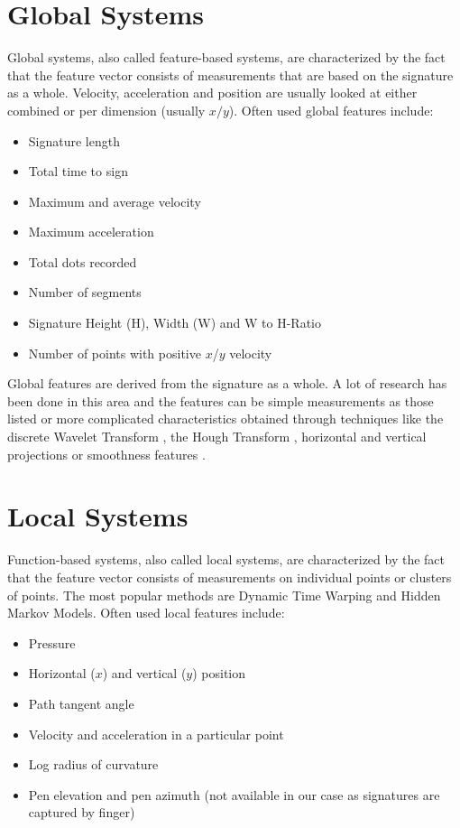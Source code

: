 \documentclass[a4paper, oneside]{csthesis}
\begin{document}
\section{Global Systems}
\label{sec:features}

Global systems, also called feature-based systems, are characterized by the fact that the feature vector consists of measurements that are based on the signature as a whole. Velocity, acceleration and position are usually looked at either combined or per dimension (usually $x/y$). Often used global features include:

\begin{itemize}
\item Signature length
\item Total time to sign
\item Maximum and average velocity
\item Maximum acceleration
\item Total dots recorded
\item Number of segments
\item Signature Height (H), Width (W) and W to H-Ratio
\item Number of points with positive $x$/$y$ velocity
\end{itemize}


Global features are derived from the signature as a whole. A lot of research has been done in this area and the features can be simple measurements as those listed or more complicated characteristics obtained through techniques like the discrete Wavelet Transform \cite{ji2005signature}, the Hough Transform \cite{kaewkongka1999off}, horizontal and vertical projections \cite{fang2003off} or smoothness features \cite{fang2001offline}.




\section{Local Systems}
\label{sec:functions}


Function-based systems, also called local systems, are characterized by the fact that the feature vector consists of measurements on individual points or clusters of points.
The most popular methods are Dynamic Time Warping and Hidden Markov Models. Often used local features include:

\begin{itemize}
\item Pressure
\item Horizontal ($x$) and vertical ($y$) position
\item Path tangent angle
\item Velocity and acceleration in a particular point
\item Log radius of curvature
\item Pen elevation and pen azimuth (not available in our case as signatures are captured by finger)
\end{itemize}
\end{document}
